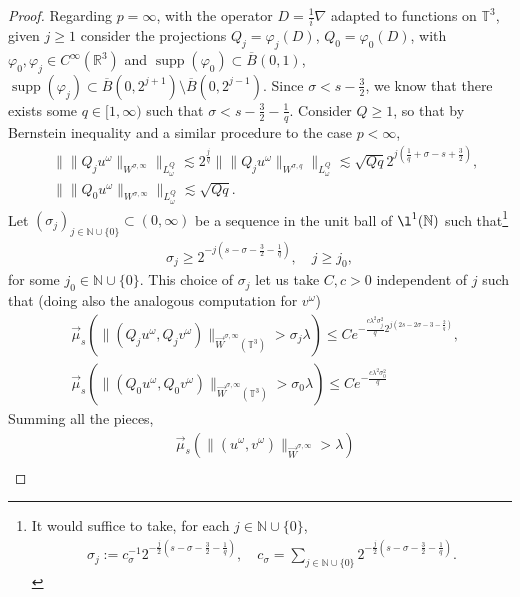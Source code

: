 \documentclass[a4paper, reqno, 11pt]{amsart}
\theoremstyle{definition}
\DeclareMathOperator\supp{supp}
\begin{document}
\begin{proof}
Regarding $p=\infty$, with the operator $D = \frac{1}{i}\nabla$ adapted to functions on $\mathbb{T}^3$, given $j \geq 1$ consider the projections $Q_j = \varphi_j(D)$, $Q_0 = \varphi_0(D)$, with $\varphi_0, \varphi_j \in C^{\infty}(\mathbb{R}^3)$ and $\supp(\varphi_0) \subset \overline{B}(0,1)$, $\supp(\varphi_j) \subset \overline{B}(0,2^{j+1})\setminus \overline{B}(0,2^{j-1})$. Since $\sigma < s - \frac{3}{2}$, we know that there exists some $q \in [1,\infty)$ such that $\sigma < s - \frac{3}{2} - \frac{1}{q}$. Consider $Q \geq 1$, so that by Bernstein inequality and a similar procedure to the case $p < \infty$,
\begin{align*}
&\| \| Q_j u^{\omega} \|_{W^{\sigma,\infty}} \|_{L^Q_{\omega}} \lesssim 2^{\frac{j}{q}} \| \| Q_j u^{\omega} \|_{W^{\sigma,q}} \|_{L^Q_{\omega}} \lesssim \sqrt{Qq} 2^{j\left( \frac{1}{q} + \sigma - s + \frac{3}{2} \right)}, \nonumber \\
&\| \| Q_0 u^{\omega} \|_{W^{\sigma,\infty}} \|_{L^Q_{\omega}} \lesssim \sqrt{Qq}.
\end{align*}
Let $(\sigma_j)_{j \in \mathbb{N} \cup \{0\}} \subset (0,\infty)$ be a sequence in the unit ball of $\l^1(\mathbb{N})$ such that\footnote{It would suffice to take, for each $j \in \mathbb{N} \cup \{0\}$,
\begin{align*}
\sigma_j := c_{\sigma}^{-1} 2^{-\frac{j}{2}(s -  \sigma - \frac{3}{2} - \frac{1}{q})}, \quad c_{\sigma} = \sum_{j \in \mathbb{N} \cup \{0\}} 2^{-\frac{j}{2}(s - \sigma - \frac{3}{2} - \frac{1}{q})}.
\end{align*}}
\begin{align*}
\sigma_j \geq 2^{-j(s -  \sigma - \frac{3}{2} - \frac{1}{q})}, \quad j \geq j_0,
\end{align*}
for some $j_0 \in \mathbb{N} \cup \{0\}$. This choice of $\sigma_j$ let us take $C,c > 0$ independent of $j$ such that (doing also the analogous computation for $v^{\omega}$)
\begin{align*}
&\vec{\mu}_s(\| (Q_j u^{\omega},Q_jv^{\omega}) \|_{\vec{W}^{\sigma,\infty}(\mathbb{T}^3)} > \sigma_j \lambda) \leq C e^{-\frac{c\lambda^2 \sigma_j^2}{q} 2^{j(2s - 2 \sigma - 3 - \frac{2}{q})}}, \nonumber \\
&\vec{\mu}_s(\| (Q_0 u^{\omega},Q_0 v^{\omega}) \|_{\vec{W}^{\sigma,\infty}(\mathbb{T}^3)} > \sigma_0 \lambda) \leq C e^{-\frac{c\lambda^2\sigma_0^2}{q}}
\end{align*}
Summing all the pieces,
\begin{align*}
&\vec{\mu}_s(\| (u^{\omega},v^{\omega}) \|_{\vec{W}^{\sigma,\infty}} > \lambda) \nonumber \\ 

\end{align*}
\end{proof}
\end{document}
